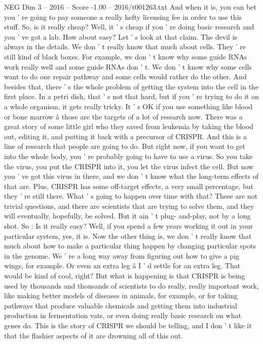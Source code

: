 \begin{textsample}{NEG Dim 3 – 2016 – Score -1.00 – 2016/t001263.txt}
And when it is, you can bet you ' re going to pay someone a really hefty licensing fee in order to use this stuff.
So, is it really cheap?
Well, it ' s cheap if you ' re doing basic research and you ' ve got a lab.
How about easy?
Let ' s look at that claim.
The devil is always in the details.
We don ' t really know that much about cells.
They ' re still kind of black boxes.
For example, we don ' t know why some guide RNAs work really well and some guide RNAs don ' t.
We don ' t know why some cells want to do one repair pathway and some cells would rather do the other.
And besides that, there ' s the whole problem of getting the system into the cell in the first place.
In a petri dish, that ' s not that hard, but if you ' re trying to do it on a whole organism, it gets really tricky.
It ' s OK if you use something like blood or bone marrow â those are the targets of a lot of research now.
There was a great story of some little girl who they saved from leukemia by taking the blood out, editing it, and putting it back with a precursor of CRISPR.
And this is a line of research that people are going to do.
But right now, if you want to get into the whole body, you ' re probably going to have to use a virus.
So you take the virus, you put the CRISPR into it, you let the virus infect the cell.
But now you ' ve got this virus in there, and we don ' t know what the long-term effects of that are.
Plus, CRISPR has some off-target effects, a very small percentage, but they ' re still there.
What ' s going to happen over time with that?
These are not trivial questions, and there are scientists that are trying to solve them, and they will eventually, hopefully, be solved.
But it ain ' t plug- and-play, not by a long shot.
So : Is it really easy?
Well, if you spend a few years working it out in your particular system, yes, it is.
Now the other thing is, we don ' t really know that much about how to make a particular thing happen by changing particular spots in the genome.
We ' re a long way away from figuring out how to give a pig wings, for example.
Or even an extra leg â I ' d settle for an extra leg.
That would be kind of cool, right?
But what is happening is that CRISPR is being used by thousands and thousands of scientists to do really, really important work, like making better models of diseases in animals, for example, or for taking pathways that produce valuable chemicals and getting them into industrial production in fermentation vats, or even doing really basic research on what genes do.
This is the story of CRISPR we should be telling, and I don ' t like it that the flashier aspects of it are drowning all of this out.

\end{textsample}
